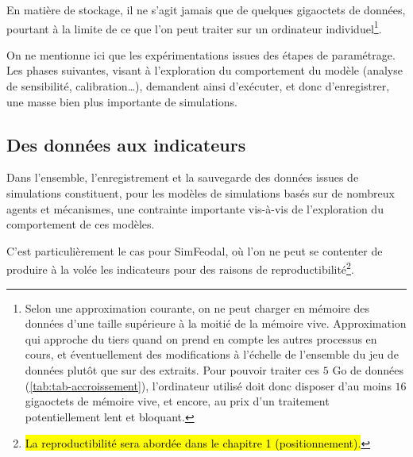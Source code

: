 En matière de stockage, il ne s'agit jamais que de quelques gigaoctets de données, pourtant à la limite de ce que l'on peut traiter sur un ordinateur individuel\footnote{
	Selon une approximation courante, on ne peut charger en mémoire des données d'une taille supérieure à la moitié de la mémoire vive.
	Approximation qui approche du tiers quand on prend en compte les autres processus en cours, et éventuellement des modifications à l'échelle de l'ensemble du jeu de données plutôt que sur des extraits.
	Pour pouvoir traiter ces $5$ Go de données (\cref{tab:tab-accroissement}), l'ordinateur utilisé doit donc disposer d'au moins $16$ gigaoctets de mémoire vive, et encore, au prix d'un traitement potentiellement lent et bloquant.
}.

On ne mentionne ici que les expérimentations issues des étapes de paramétrage.
Les phases suivantes, visant à l'exploration du comportement du modèle (analyse de sensibilité, calibration\ldots), demandent ainsi d'exécuter, et donc d'enregistrer, une masse bien plus importante de simulations.

\subsection{Des données aux indicateurs}\label{subsec:donnees-indicateurs}

Dans l'ensemble, l'enregistrement et la sauvegarde des données issues de simulations constituent, pour les modèles de simulations basés sur de nombreux agents et mécanismes, une contrainte importante vis-à-vis de l'exploration du comportement de ces modèles.

C'est particulièrement le cas pour SimFeodal, où l'on ne peut se contenter de produire à la volée les indicateurs pour des raisons de reproductibilité\footnote{
	\hl{La reproductibilité sera abordée dans le chapitre 1 (positionnement).}
}. 


